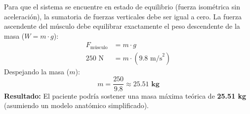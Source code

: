 \documentclass[12pt]{article}
\begin{document}
\begin{tcolorbox}
\begin{center}
    \end{center}

    \vspace{0.4cm}
    \begin{tcolorbox}[colback=medteal!10, colframe=medteal, arc=2mm, boxrule=1.2pt, title=\textbf{Desarrollo Matemático y Solución}]
        Para que el sistema se encuentre en estado de equilibrio (fuerza isométrica sin aceleración), la sumatoria de fuerzas verticales debe ser igual a cero. La fuerza ascendente del músculo debe equilibrar exactamente el peso descendente de la masa ($W = m \cdot g$):
        \begin{align*}
            F_{\text{músculo}} &= m \cdot g \\[1ex]
            250 \text{ N} &= m \cdot (9.8 \text{ m/s}^2)
        \end{align*}
        Despejando la masa ($m$):
        \[ m = \frac{250}{9.8} \approx \mathbf{25.51 \text{ kg}} \]
        \textbf{Resultado:} El paciente podría sostener una masa máxima teórica de \textbf{25.51 kg} (asumiendo un modelo anatómico simplificado).
    \end{tcolorbox}
    
\end{tcolorbox}
\end{document}
